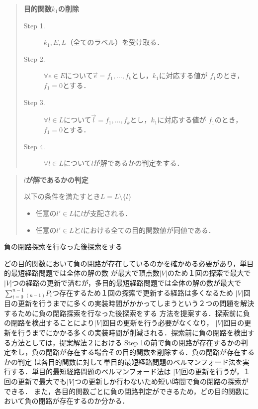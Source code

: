 \documentclass[12pt]{optlab-bachelor}
\begin{document}
\begin{quote}
  \textbf{目的関数$k_1$の削除}
  \begin{description}
    \item[Step 1.] $k_1,E,L$（全てのラベル）を受け取る．
    \item[Step 2.] $\forall e \in E$について$\vec{e}={f_1,\ldots,f_k}$とし，$k_1$に対応する値が
    $f_1$のとき，$f_1=0$とする．
    \item[Step 3.] $\forall l \in L$について$\vec{l}={f_1,\ldots,f_k}$とし，$k_1$に対応する値が
    $f_1$のとき，$f_1=0$とする．
    \item[Step 4.] $\forall l \in L$について$l$が解であるかの判定をする．
  \end{description}
\end{quote}

\begin{quote}
  \textbf{$l$が解であるかの判定}

  以下の条件を満たすとき$L=L \setminus \{ l\}$
    \begin{itemize}
      \item 任意の$l' \in L$に$l$が支配される．
      \item 任意の$l' \in L$と$l$における全ての目的関数値が同値である．
    \end{itemize}
\end{quote}

\begin{description}
  \item[負の閉路探索を行なった後探索をする]
\end{description}

どの目的関数において負の閉路が存在しているのかを確かめる必要があり，単目的最短経路問題では全体の解の数
が最大で頂点数$|V|$のため１回の探索で最大で$|V|$つの経路の更新で済むが，多目的最短経路問題では全体の解の数が最大で
$\displaystyle \sum_{i=0}^{n-1} {}_{(n-1)}P_i$つ存在するため１回の探索で更新する経路は多くなるため
$|V|$回目の更新を行うまでに多くの実装時間がかかってしまうという２つの問題を解決するために負の閉路探索を行なった後探索をする
方法を提案する．探索前に負の閉路を検出することにより$|V|$回目の更新を行う必要がなくなり，
$|V|$回目の更新を行うまでにかかる多くの実装時間が削減される．探索前に負の閉路を検出する方法としては，提案解法２における
Step 1の前で負の閉路が存在するかの判定をし，負の閉路が存在する場合その目的関数を削除する．負の閉路が存在するかの判定
は各目的関数に対して単目的最短経路問題のベルマンフォード法を実行する．単目的最短経路問題のベルマンフォード法は
$|V|$回の更新を行うが，１回の更新で最大でも$|V|$つの更新しか行わないため短い時間で負の閉路の探索ができる．
また，各目的関数ごとに負の閉路判定ができるため，どの目的関数において負の閉路が存在するのか分かる．
\end{document}
